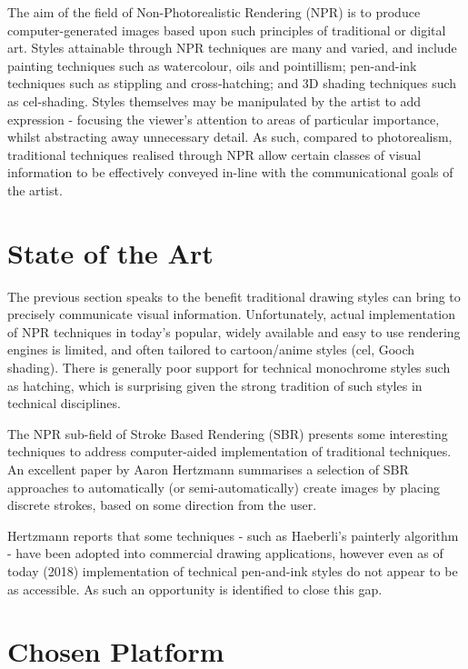 The aim of the field of Non-Photorealistic Rendering (NPR) is to produce computer-generated images based upon such principles of traditional or digital art.
Styles attainable through NPR techniques are many and varied, and include painting techniques such as watercolour, oils and pointillism; pen-and-ink techniques such as stippling and cross-hatching; and 3D shading techniques such as cel-shading.
Styles themselves may be manipulated by the artist to add expression - focusing the viewer's attention to areas of particular importance, whilst abstracting away unnecessary detail.
As such, compared to photorealism, traditional techniques realised through NPR allow certain classes of visual information to be effectively conveyed in-line with the communicational goals of the artist.

\section{State of the Art}

The previous section speaks to the benefit traditional drawing styles can bring to precisely communicate visual information. Unfortunately, actual implementation of NPR techniques in today's popular, widely available and easy to use rendering engines is limited, and often tailored to cartoon/anime styles (cel, Gooch shading).
There is generally poor support for technical monochrome styles such as hatching, which is surprising given the strong tradition of such styles in technical disciplines.

The NPR sub-field of Stroke Based Rendering (SBR) presents some interesting techniques to address computer-aided implementation of traditional techniques.
An excellent paper by Aaron Hertzmann \citep{hertzmann2002} summarises a selection of SBR approaches to automatically (or semi-automatically) create images by placing discrete strokes, based on some direction from the user.

Hertzmann reports that some techniques - such as Haeberli's painterly algorithm \citep{haeberli1990} - have been adopted into commercial drawing applications, however even as of today (2018) implementation of technical pen-and-ink styles do not appear to be as accessible. As such an opportunity is identified to close this gap.

\section{Chosen Platform}

